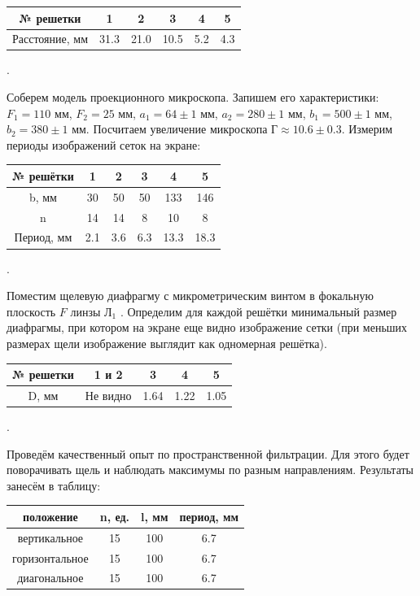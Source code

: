 \documentclass[a4paper, 12pt]{article}
\newcounter{Points}
\newcommand{\point}{\arabic{Points}. \addtocounter{Points}{1}}
\begin{document}
\begin{table}[!h]
	\centering
\begin{tabular}{|c|c|c|c|c|c|} \hline
	№ решетки & 1 & 2 & 3 & 4 & 5 \\ \hline
	Расстояние, мм & 31.3 & 21.0 & 10.5 & 5.2 & 4.3 \\ \hline
\end{tabular}
\end{table}

\point Соберем модель проекционного микроскопа. Запишем его характеристики: $F_1 = 110$ мм, $F_2 = 25$ мм,  $a_1 = 64 \pm 1$ мм, $a_2 = 280 \pm 1$ мм, $b_1 = 500 \pm 1$ мм, $b_2 = 380 \pm 1$ мм. Посчитаем увеличение микроскопа $Г \approx 10.6 \pm 0.3$. Измерим периоды изображений сеток на экране:

\begin{table}[!h]
	\centering
\begin{tabular}{|c|c|c|c|c|c|} \hline
	№ решётки & 1 & 2 & 3 & 4 & 5 \\ \hline
	b, мм & 30 & 50 & 50 & 133 & 146 \\ \hline
	n & 14 & 14 & 8 & 10 & 8 \\ \hline
	Период, мм & 2.1 & 3.6 & 6.3 & 13.3 & 18.3 \\ \hline
\end{tabular}
\end{table}

\point Поместим щелевую диафрагму с микрометрическим винтом в фокальную плоскость $F$ линзы $Л_1$ . Определим для каждой решётки минимальный размер диафрагмы, при котором на экране еще видно изображение сетки (при меньших размерах щели изображение выглядит как одномерная решётка).

\begin{table}[!h]
	\centering
\begin{tabular}{|c|c|c|c|c|} \hline
	№ решетки & 1 и 2 & 3 & 4 & 5 \\ \hline
	D, мм & Не видно & 1.64 & 1.22 & 1.05 \\ \hline
\end{tabular}
\end{table}

\point Проведём качественный опыт по пространственной фильтрации. Для этого будет поворачивать щель и наблюдать максимумы по разным направлениям. Результаты занесём в таблицу:

\begin{table}[!h]
	\centering
\begin{tabular}{|c|c|c|c|} \hline
	положение & n, ед. & l, мм & период, мм \\ \hline
	вертикальное   & 15 & 100 & 6.7 \\ \hline %
	горизонтальное & 15 & 100 & 6.7 \\ \hline
	диагональное   & 15 & 100 & 6.7 \\ \hline
\end{tabular}
\end{table}
\end{document}
